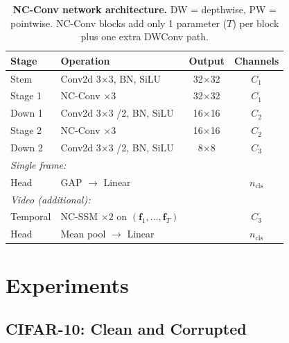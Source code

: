 \documentclass[10pt,twocolumn,letterpaper]{article}
\begin{document}
\begin{table}[t]
\centering
\caption{\textbf{NC-Conv network architecture.} DW = depthwise, PW = pointwise. NC-Conv blocks add only 1 parameter ($T$) per block plus one extra DWConv path.}
\label{tab:arch}
\setlength{\tabcolsep}{3pt}
\footnotesize
\begin{tabular}{@{}llcc@{}}
\toprule
\textbf{Stage} & \textbf{Operation} & \textbf{Output} & \textbf{Channels} \\
\midrule
Stem & Conv2d 3$\times$3, BN, SiLU & 32$\times$32 & $C_1$ \\
Stage 1 & NC-Conv $\times 3$ & 32$\times$32 & $C_1$ \\
Down 1 & Conv2d 3$\times$3 /2, BN, SiLU & 16$\times$16 & $C_2$ \\
Stage 2 & NC-Conv $\times 3$ & 16$\times$16 & $C_2$ \\
Down 2 & Conv2d 3$\times$3 /2, BN, SiLU & 8$\times$8 & $C_3$ \\
\midrule
\multicolumn{4}{l}{\textit{Single frame:}} \\
Head & GAP $\to$ Linear & & $n_{\text{cls}}$ \\
\midrule
\multicolumn{4}{l}{\textit{Video (additional):}} \\
Temporal & NC-SSM $\times 2$ on $(\mathbf{f}_1,\ldots,\mathbf{f}_T)$ & & $C_3$ \\
Head & Mean pool $\to$ Linear & & $n_{\text{cls}}$ \\
\bottomrule
\end{tabular}
\end{table}


\section{Experiments}
\label{sec:experiments}

\subsection{CIFAR-10: Clean and Corrupted}
\end{document}
